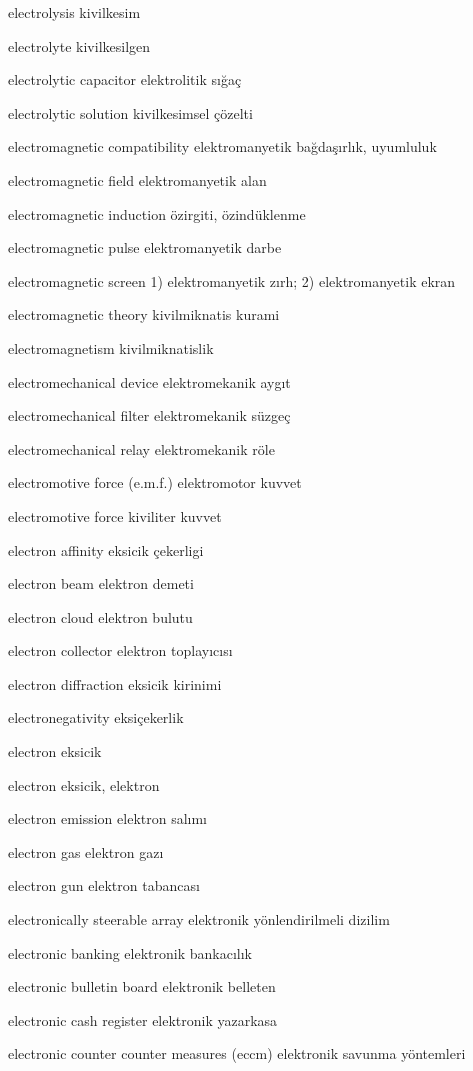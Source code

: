 \documentclass[12pt,fleqn]{article}\usepackage{../../common}
\begin{document}
electrolysis kivilkesim

electrolyte kivilkesilgen

electrolytic capacitor elektrolitik sığaç

electrolytic solution kivilkesimsel çözelti

electromagnetic compatibility elektromanyetik bağdaşırlık, uyumluluk

electromagnetic field elektromanyetik alan

electromagnetic induction özirgiti, özindüklenme

electromagnetic pulse elektromanyetik darbe

electromagnetic screen 1) elektromanyetik zırh; 2) elektromanyetik ekran

electromagnetic theory kivilmiknatis kurami

electromagnetism kivilmiknatislik

electromechanical device elektromekanik aygıt

electromechanical filter elektromekanik süzgeç

electromechanical relay elektromekanik röle

electromotive force (e.m.f.) elektromotor kuvvet

electromotive force kiviliter kuvvet

electron affinity eksicik çekerligi

electron beam elektron demeti

electron cloud elektron bulutu

electron collector elektron toplayıcısı

electron diffraction eksicik kirinimi

electronegativity eksiçekerlik

electron eksicik

electron eksicik, elektron

electron emission elektron salımı

electron gas elektron gazı

electron gun elektron tabancası

electronically steerable array elektronik yönlendirilmeli dizilim

electronic banking elektronik bankacılık

electronic bulletin board elektronik belleten

electronic cash register elektronik yazarkasa

electronic counter counter measures (eccm) elektronik savunma yöntemleri
\end{document}
